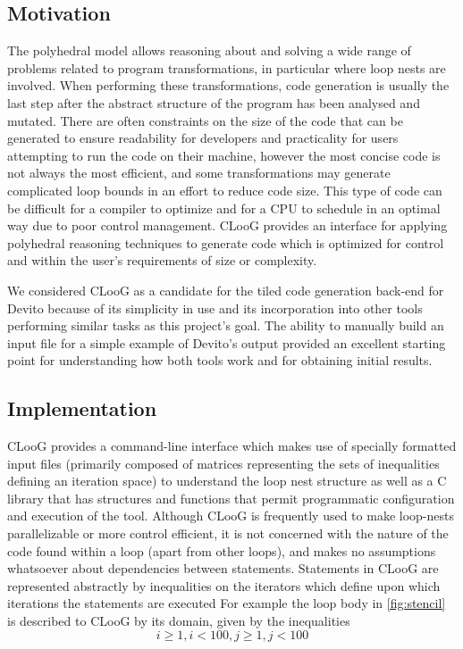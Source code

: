 \documentclass[a4paper,12pt,twoside]{report}
\begin{document}
\subsection*{Motivation}
The polyhedral model allows reasoning about and solving a wide range of problems related to program transformations,
in particular where loop nests are involved. When performing these transformations, code generation is usually the last
step after the abstract structure of the program has been analysed and mutated. There are often constraints on the size of the code
that can be generated to ensure readability for developers and practicality for users attempting to run the code on their machine,
however the most concise code is not always the most efficient, and some transformations may generate complicated loop bounds in an effort
to reduce code size. This type of code can be difficult for a compiler to optimize and for a CPU to schedule in an optimal way due to
poor control management. CLooG provides an interface for applying polyhedral reasoning techniques to generate code which is optimized for control
and within the user's requirements of size or complexity.

We considered CLooG as a candidate for the tiled code generation back-end for Devito because of its simplicity in use and its incorporation into
other tools performing similar tasks as this project's goal. The ability to manually build an input file for a simple example of Devito's
output provided an excellent starting point for understanding how both tools work and for obtaining initial results.

\subsection*{Implementation}
CLooG provides a command-line interface which makes use of specially formatted input files (primarily composed of matrices representing
the sets of inequalities defining an iteration space) to understand the loop nest structure as well as a C library that has structures and
functions that permit programmatic configuration and execution of the tool.
Although CLooG is frequently used to make loop-nests parallelizable or more control efficient, it is not concerned with the nature of the
code found within a loop (apart from other loops), and makes no assumptions whatsoever about dependencies between statements.
Statements in CLooG are represented abstractly by inequalities on the iterators which define upon which iterations the statements are executed 
For example the loop body in \ref{fig:stencil} is described to CLooG by its domain, given by the inequalities
\[i \ge 1 , i < 100 , j \ge 1, j < 100 \]
\end{document}
